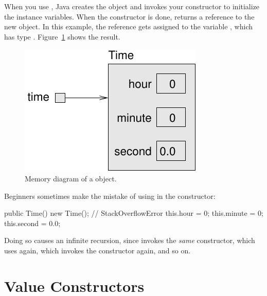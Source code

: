 
When you use , Java creates the object and invokes your constructor to initialize the instance variables.
When the constructor is done,  returns a reference to the new object.
In this example, the reference gets assigned to the variable , which has type .
Figure~\ref{fig.time} shows the result.


\begin{figure}[!ht]
\begin{center}
\includegraphics{figs/time.pdf}
\caption{Memory diagram of a  object.}
\label{fig.time}
\end{center}
\end{figure}


Beginners sometimes make the mistake of using  in the constructor:

\begin{code}
public Time() {
    new Time();         // StackOverflowError
    this.hour = 0;
    this.minute = 0;
    this.second = 0.0;
}
\end{code}

Doing so causes an infinite recursion, since  invokes the {\em same} constructor, which uses  again, which invokes the constructor again, and so on.



\section{Value Constructors}

